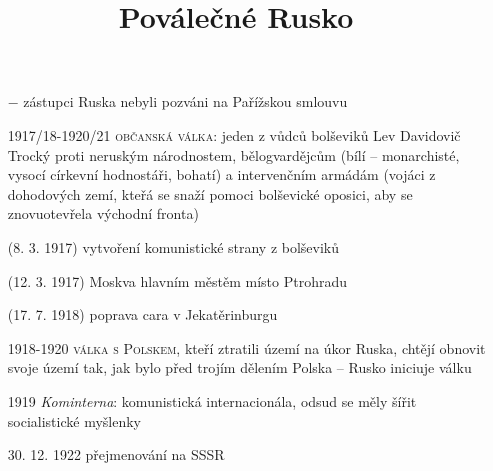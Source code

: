 \documentclass{article}
\title{\vspace{-2cm}Poválečné Rusko\vspace{-1.7cm}}
\date{}
\author{}
\begin{document}
\maketitle

\begin{itemize}
    \vspace{-0.5em}
    \setlength\itemsep{0.15em}
    \item[$-$] zástupci Ruska nebyli pozváni na Pařížskou smlouvu
    \item[1917/18-1920/21] \textsc{občanská válka}: jeden z vůdců bolševiků Lev Davidovič Trocký proti neruským národnostem, bělogvardějcům (bílí -- monarchisté, vysocí církevní hodnostáři, bohatí) a intervenčním armádám (vojáci z dohodových zemí, kteřá se snaží pomoci bolševické oposici, aby se znovuotevřela východní fronta)
    \item[(8. 3. 1917)] vytvoření komunistické strany z bolševiků
    \item[(12. 3. 1917)] Moskva hlavním městěm místo Ptrohradu
    \item[(17. 7. 1918)] poprava cara v Jekatěrinburgu
    \item[1918-1920] \textsc{válka s Polskem}, kteří ztratili území na úkor Ruska, chtějí obnovit svoje území tak, jak bylo před trojím dělením Polska -- Rusko iniciuje válku
    \item[1919] \textit{Kominterna}: komunistická internacionála, odsud se měly šířit socialistické myšlenky
    \item[30. 12. 1922] přejmenování na SSSR
\end{itemize}
\end{document}
